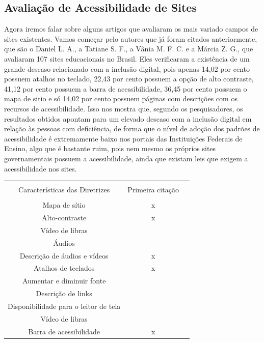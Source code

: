 \documentclass[a4paper]{article}
\begin{document}
\begin{titlepage}
\subsection{Avaliação de Acessibilidade de Sites}
Agora iremos falar sobre alguns artigos que avaliaram os mais variado campos de sites existentes.  Vamos começar pelo autores que já foram citados anteriormente, que são o Daniel L. A., a Tatiane S. F., a Vânia M. F. C. e a Márcia Z. G., que avaliaram 107 sites educacionais no Brasil. Eles verificaram a existência de um grande descaso relacionado com a inclusão digital, pois apenas 14,02 por cento possuem atalhos no teclado, 22,43 por cento possuem a opção de alto contraste, 41,12 por cento possuem a barra de acessibilidade, 36,45 por cento possuem o mapa de sitio e só 14,02 por cento possuem páginas com descrições com os recursos de acessibilidade. Isso nos mostra que, segundo os pesquisadores, os resultados obtidos apontam para um elevado descaso com a inclusão digital em relação às pessoas com deficiência, de forma que o nível de adoção dos padrões de acessibilidade é extremamente baixo nos portais das Instituições Federais de Ensino, algo que é bastante ruim, pois nem mesmo os próprios sites governamentais possuem a acessibilidade, ainda que existam leis que exigem a acessibilidade nos sites.

\begin{center}
	\begin{tabular}{ccc}
		\hline \\[0.2cm]
		Características das Diretrizes & Primeira citação\\[0.2cm]
		\hline \\[0.2cm]
		Mapa de sítio & x \\[0.2cm]
		Alto-contraste &  x \\[0.2cm]
		Vídeo de libras &  \\[0.2cm]
		Áudios &  \\[0.2cm]
		Descrição de áudios e vídeos & x \\[0.2cm]
		Atalhos de teclados & x \\[0.2cm]
		Aumentar e diminuir fonte &  \\[0.2cm]
		Descrição de links &  \\[0.2cm]
		Disponibilidade para o leitor de tela &  \\[0.2cm]
		Vídeo de libras &  \\[0.2cm]
		Barra de acessibilidade & x \\[0.2cm]
		\hline
	\end{tabular}


\end{center}
\end{titlepage}
\end{document}
